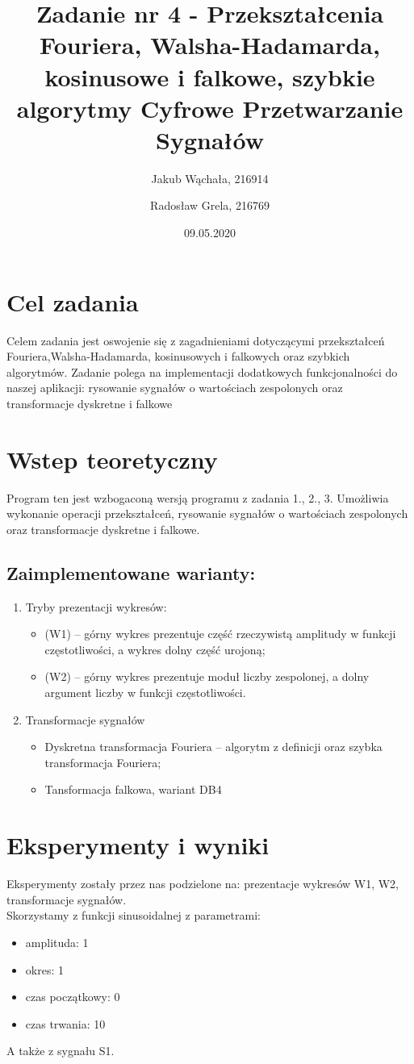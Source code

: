 \documentclass[12pt]{article}
\title{{\bf Zadanie nr 4 - Przekształcenia Fouriera, Walsha-Hadamarda, kosinusowe i falkowe, szybkie algorytmy}\linebreak
Cyfrowe Przetwarzanie Sygnałów}
\author{Jakub Wąchała, 216914 \and Radosław Grela, 216769}
\date{09.05.2020}
\begin{document}
\clearpage\maketitle
\thispagestyle{empty}
\newpage
\setcounter{page}{1}
\section{Cel zadania}
\label{cel}
Celem zadania jest oswojenie się z zagadnieniami dotyczącymi przekształceń Fouriera,Walsha-Hadamarda, kosinusowych i falkowych oraz szybkich algorytmów. Zadanie polega na implementacji dodatkowych funkcjonalności do naszej aplikacji: rysowanie sygnałów o wartościach zespolonych oraz transformacje dyskretne i falkowe \cite{bib1}

\section{Wstep teoretyczny}
Program ten jest wzbogaconą wersją programu z zadania 1., 2., 3. Umożliwia wykonanie operacji przekształceń,  rysowanie sygnałów o wartościach zespolonych oraz transformacje dyskretne i falkowe.

\subsection {Zaimplementowane warianty:}
\begin {enumerate}
\item Tryby prezentacji wykresów:
\begin {itemize}
\item (W1) – górny wykres prezentuje część rzeczywistą amplitudy w funkcji częstotliwości, a wykres dolny część urojoną;
\item (W2) – górny wykres prezentuje moduł liczby zespolonej, a dolny argument liczby w funkcji częstotliwości.
\end {itemize}
\item Transformacje sygnałów
\begin {itemize}
\item Dyskretna transformacja Fouriera – algorytm z definicji oraz szybka transformacja Fouriera;
\item Tansformacja falkowa, wariant DB4
\end {itemize}
\end{enumerate}

\section{Eksperymenty i wyniki}
Eksperymenty zostały przez nas podzielone na: prezentacje wykresów W1, W2, transformacje sygnałów.  
\\
Skorzystamy z funkcji sinusoidalnej z parametrami:
\begin{itemize}
\item amplituda: 1
\item okres: 1
\item czas początkowy: 0
\item czas trwania: 10
\end{itemize}
A także z sygnału S1.
\end{document}
